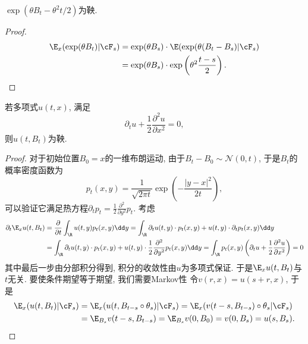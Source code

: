 \documentclass[a4paper, 10pt]{ctexart}
\begin{document}
\begin{theorem}
	$\exp(\theta B_t - \theta^2 t / 2)$为鞅. 
\end{theorem}
\begin{proof}
	\begin{align*}
		\E_x(\exp(\theta B_t) | \cF_s)
		&= \exp(\theta B_s) \cdot \E(\exp(\theta(B_t - B_s) | \cF_s) \\
		&= \exp(\theta B_s) \cdot \exp \left(\theta^2 \frac{t-s}{2} \right). 
	\end{align*}
\end{proof}

\begin{theorem}
	若多项式$u(t,x)$, 满足
	\begin{equation*}
		\partial_t u  + \frac{1}{2} \frac{\partial^2 u}{\partial x^2} = 0, 
	\end{equation*}
	则$u(t, B_t)$为鞅. 
\end{theorem}
\begin{proof}
	对于初始位置$B_0  = x$的一维布朗运动, 由于$B_t - B_0 \sim \mathcal N(0, t)$, 于是$B_t$的概率密度函数为
	\begin{equation*}
		p_t(x, y) = \frac{1}{\sqrt{2 \pi t}} \exp\left( - \frac{|y - x|^2}{2t} \right), 
	\end{equation*}
	可以验证它满足热方程$\partial_t p_t = \frac{1}{2} \frac{\partial^2}{\partial y^2} p_t$. 
	考虑
	\begin{align*}
		\partial_t \E_x u(t, B_t)
		&= \frac{\partial}{\partial t} \int_{\R} u(t, y) p_t(x, y) \dd y 
		= \int_{\R} \partial_t u(t, y) \cdot p_t(x, y) + u(t, y) \cdot \partial_t p_t(x, y) \dd y \\
		&= \int_{\R} \partial_t u(t, y) \cdot p_t(x, y) + u(t, y) \cdot \frac{1}{2} \frac{\partial^2}{\partial y^2} p_t(x, y) \dd y 
		= \int_{\R} p_t(x,y) \left( \partial_t u  + \frac{1}{2} \frac{\partial^2 u}{\partial x^2} \right) = 0
	\end{align*}
	其中最后一步由分部积分得到, 积分的收敛性由$u$为多项式保证. 
	于是$\E_x u(t, B_t)$与$t$无关. 
	要使条件期望等于期望, 我们需要Markov性
	令$v(r, x) = u(s+r, x)$, 于是
	\begin{align*}
		\E_x(u(t, B_t) | \cF_s)
		&= \E_x(u(t, B_{t - s} \circ \theta_s) | \cF_s) 
		= \E_x(v(t -s, B_{t-s}) \circ \theta_s | \cF_s) \\
		&= \E_{B_s} v(t -s, B_{t-s}) 
		= \E_{B_s} v(0, B_0) 
		= v(0, B_s)
		= u(s, B_s). 
	\end{align*}
\end{proof}
\end{document}
